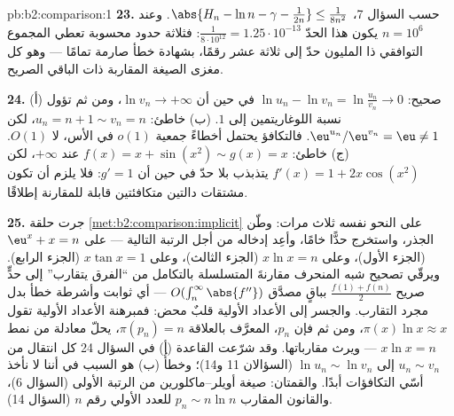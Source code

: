 \begin{solution}{pb:b2:comparison:1}
\textbf{23.} حسب السؤال 7، $\abs{H_n - \ln n - \gamma -
\frac1{2n}} \leq \frac1{8n^2}$. وعند $n = 10^6$ يكون هذا الحدّ
$\frac{1}{8\cdot10^{12}} = 1.25\cdot10^{-13}$: فثلاثة حدود محسوبة
تعطي المجموع التوافقي ذا المليون حدّ إلى ثلاثة عشر
رقمًا، بشهادة خطأ صارمة تمامًا --- وهو كل
مغزى الصيغة المقاربة ذات الباقي الصريح.

\textbf{24.} (أ) صحيح: $\ln u_n - \ln v_n = \ln\frac{u_n}{v_n}
\to 0$ في حين أن $\ln v_n \to +\infty$، ومن ثم تؤول نسبة اللوغاريتمين
إلى $1$. (ب) خاطئ: $u_n = n + 1 \sim v_n = n$، لكن
$\eu^{u_n}/\eu^{v_n} = \eu \neq 1$. فالتكافؤ يحتمل
أخطاءً جمعية $o(1)$ في الأس، لا $O(1)$. (ج) خاطئ:
$f(x) = x + \sin(x^2) \sim g(x) = x$ عند $+\infty$، لكن $f'(x)
= 1 + 2x\cos(x^2)$ يتذبذب بلا حدّ في حين أن $g' = 1$:
فلا يلزم أن تكون مشتقات دالتين متكافئتين قابلة للمقارنة
إطلاقًا.

\textbf{25.} جرت حلقة \cref{met:b2:comparison:implicit}
على النحو نفسه ثلاث مرات: وطّن الجذر، واستخرج حدًّا
خامًا، وأعِد إدخاله من أجل الرتبة التالية --- على $\eu^x + x = n$
(الجزء الأول)، وعلى $x\ln x = n$ (الجزء الثالث)، وعلى $x\tan x = 1$ (الجزء
الرابع). ويرقّي تصحيح شبه المنحرف مقارنةَ المتسلسلة
بالتكامل من ``الفرق يتقارب'' إلى حدٍّ صريح
$\frac{f(1) + f(n)}2$ بباقٍ مصدَّق $O(\int_n^\infty
\abs{f''})$ --- أي ثوابت وأشرطة خطأ بدل
مجرد التقارب. والجسر إلى الأعداد الأولية قلبٌ محض: فمبرهنة
الأعداد الأولية تقول $\pi(x)\ln x \approx x$، ومن ثم فإن $p_n$،
المعرَّف بالعلاقة $\pi(p_n) = n$، يحلّ معادلة من نمط $x\ln x = n$ ---
ويرث مقارباتها. وقد شرّعت القاعدة (أ) في السؤال 24
كل انتقال من $u_n \sim v_n$ إلى $\ln u_n \sim
\ln v_n$ (السؤالان 11 و14)؛ وخطأُ (ب) هو السبب في أننا
لا نأخذ أسّي التكافؤات أبدًا. والقمتان: صيغة أويلر--ماكلورين
من الرتبة الأولى (السؤال 6)، والقانون المقارب
$p_n \sim n\ln n$ للعدد الأولي رقم $n$ (السؤال 14).
\end{solution}
